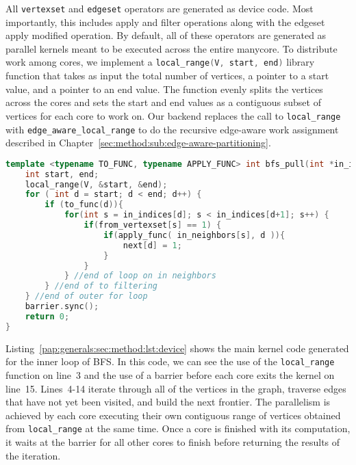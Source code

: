 All \lstinline[language=graphit]{vertexset} and  \lstinline[language=graphit]{edgeset} operators are generated as device code. Most importantly, this includes apply and filter operations along with the edgeset apply modified operation. 
By default, all of these operators are generated as parallel kernels meant to be executed across the entire manycore. 
To distribute work among cores, we implement a \lstinline[language=C++, basicstyle=\small\ttfamily]{local_range(V, start, end)} library function that takes as input the total number of vertices, a pointer to a start value, and a pointer to an end value.
The function evenly splits the vertices across the cores and sets the start and end values as a contiguous subset of vertices for each core to work on. 
Our backend replaces the call to \lstinline[language=C++, basicstyle=\small\ttfamily]{local_range} with \lstinline[language=C++, basicstyle=\small\ttfamily]{edge_aware_local_range} to do the recursive edge-aware work assignment described in Chapter~\ref{sec:method:sub:edge-aware-partitioning}.
\newline
\begin{lstlisting}[language=C++, breaklines=true, 
                   caption=Generated manycore device code for the Breadth-First Search (BFS) program shown in Listing~\ref{pap:generals2020:sec:background:lst:graphit}.,
                   label=pap:generals:sec:method:lst:device]
template <typename TO_FUNC, typename APPLY_FUNC> int bfs_pull(int *in_indices , int *in_neighbors, int *from_vertexset, TO_FUNC to_func, APPLY_FUNC apply_func) { 
    int start, end;
    local_range(V, &start, &end);
    for ( int d = start; d < end; d++) {
        if (to_func(d)){ 
            for(int s = in_indices[d]; s < in_indices[d+1]; s++) {
                if(from_vertexset[s] == 1) {
                    if(apply_func( in_neighbors[s], d )){ 
                        next[d] = 1; 
                    }
                }
            } //end of loop on in neighbors
        } //end of to filtering
    } //end of outer for loop
    barrier.sync();
    return 0;
}
\end{lstlisting}

Listing~\ref{pap:generals:sec:method:lst:device} shows the main kernel code generated for the inner loop of BFS. 
In this code, we can see the use of the \lstinline[language=C++, basicstyle=\small\ttfamily]{local_range} function on line~3 and the use of a barrier before each core exits the kernel on line~15. 
Lines~4-14 iterate through all of the vertices in the graph, traverse edges that have not yet been visited, and build the next frontier.
The parallelism is achieved by each core executing their own contiguous range of vertices obtained from \lstinline[language=C++, basicstyle=\small\ttfamily]{local_range} at the same time. Once a core is finished with its computation, it waits at the barrier for all other cores to finish before returning the results of the iteration. 

